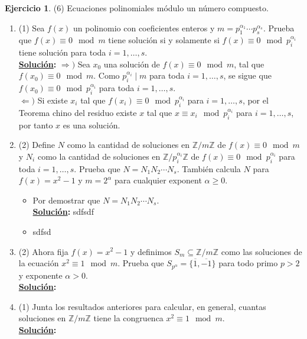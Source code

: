 \documentclass[11pt,letterpaper]{article}
\theoremstyle{definition}\newtheorem{p}{Ejercicio}
\newcommand{\Z}{\mathbb{Z}}
\newcommand{\sol}{\textbf{\underline{Solución}: }} %
\begin{document}
\begin{p}(6)
Ecuaciones polinomiales m\'odulo un n\'umero compuesto.

\begin{enumerate}
    \item(1) Sea $f(x)$ un polinomio con coeficientes enteros y $m=p_1^{\alpha_1}\cdots p_s^{\alpha_s}$.
    Prueba que $f(x)\equiv 0\mod m$ tiene soluci\'on si y solamente si $f(x)\equiv 0\mod p_i^{\alpha_i}$
    tiene soluci\'on para toda $i=1,\ldots,s$.\\
    \sol $\Longrightarrow) $ Sea $x_0$ una solución de $f(x)\equiv 0\mod m$, tal que $f(x_0)\equiv 0\mod m$.
    Como $p_i^{\alpha_i} \mid m$ para toda $i=1, \ldots, s$, se sigue que $f(x_0)\equiv 0\mod p_i^{\alpha_i}$
    para toda $i=1, \ldots, s$.\\
    $\Longleftarrow) $ Si existe $x_i$ tal que $f(x_i)\equiv 0\mod p_i^{\alpha_i}$ para $i=1, \ldots, s$, 
    por el Teorema chino del residuo existe $x$ tal que $x \equiv x_i \mod p_i^{\alpha_i}$ para
    $i=1, \ldots, s$, por tanto $x$ es una solución.

    \item(2) Define $N$ como la cantidad de soluciones en $\Z/m\Z$ de $f(x)\equiv 0\mod m$ y $N_i$
    como la cantidad de soluciones en $\Z/p_i^{\alpha_i}\Z$ de $f(x)\equiv 0\mod p_i^{\alpha_i}$ para
    toda $i=1,\ldots,s$. Prueba que $N=N_1N_2\cdots N_s$. Tambi\'en calcula $N$ para $f(x)=x^2-1$ y
    $m=2^{\alpha}$ para cualquier exponent $\alpha\geq 0$.
    \begin{itemize}
      \item Por demostrar que $N=N_1N_2\cdots N_s$.\\
      \sol sdfsdf

      \item sdfsd
    \end{itemize}

    \item(2) Ahora fija $f(x)=x^2-1$ y definimos $S_m\subseteq\Z/m\Z$ como las soluciones de la
    ecuaci\'on $x^2\equiv 1\mod m$. Prueba que $S_{p^{\alpha}}=\{\overline{1},\overline{-1}\}$ para
    todo primo $p>2$ y exponente $\alpha>0$.\\
    \sol

    \item(1) Junta los resultados anteriores para calcular, en general, cuantas soluciones en $\Z/m\Z$
    tiene la congruenca $x^2\equiv 1\mod m$.\\
    \sol
\end{enumerate}

\end{p}
\end{document}
